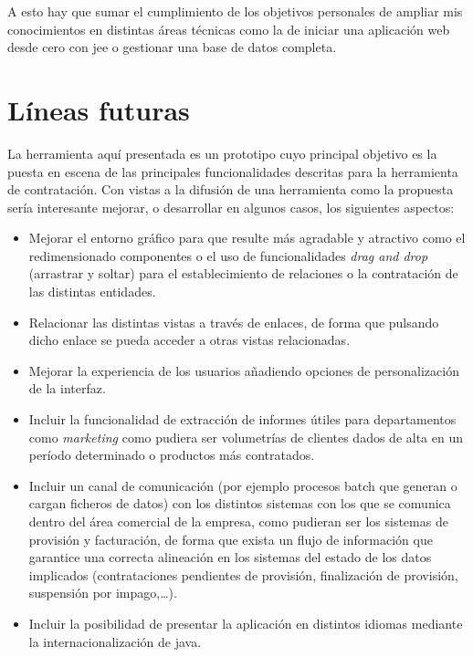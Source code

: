 A esto hay que sumar el cumplimiento de los objetivos personales de ampliar mis conocimientos en distintas áreas técnicas como la de iniciar una aplicación web desde cero con \acrshort{jee} o gestionar una base de datos completa.



\section{Líneas futuras}
\label{sec:futuro}

La herramienta aquí presentada es un prototipo cuyo principal objetivo es la puesta en escena de las principales funcionalidades descritas para la herramienta de contratación. Con vistas a la difusión de una herramienta como la propuesta sería interesante mejorar, o desarrollar en algunos casos, los siguientes aspectos:
\begin{itemize}
\item Mejorar el entorno gráfico para que resulte más agradable y atractivo como el redimensionado componentes o el uso de funcionalidades \textit{drag and drop} (arrastrar y soltar) para el establecimiento de relaciones o la contratación de las distintas entidades.
\item Relacionar las distintas vistas a través de enlaces, de forma que pulsando dicho enlace se pueda acceder a otras vistas relacionadas.
\item Mejorar la experiencia de los usuarios añadiendo opciones de personalización de la interfaz.
\item Incluir la funcionalidad de extracción de informes útiles para departamentos como \emph{marketing} como pudiera ser volumetrías de clientes dados de alta en un período determinado o productos más contratados.
\item Incluir un canal de comunicación (por ejemplo procesos batch que generan o cargan ficheros de datos) con los distintos sistemas con los que se comunica dentro del área comercial de la empresa, como pudieran ser los sistemas de provisión y facturación, de forma que exista un flujo de información que garantice una correcta alineación en los sistemas del estado de los datos implicados (contrataciones pendientes de provisión, finalización de provisión, suspensión por impago,\dots).
\item Incluir la posibilidad de presentar la aplicación en distintos idiomas mediante la internacionalización de java.
\end{itemize}
